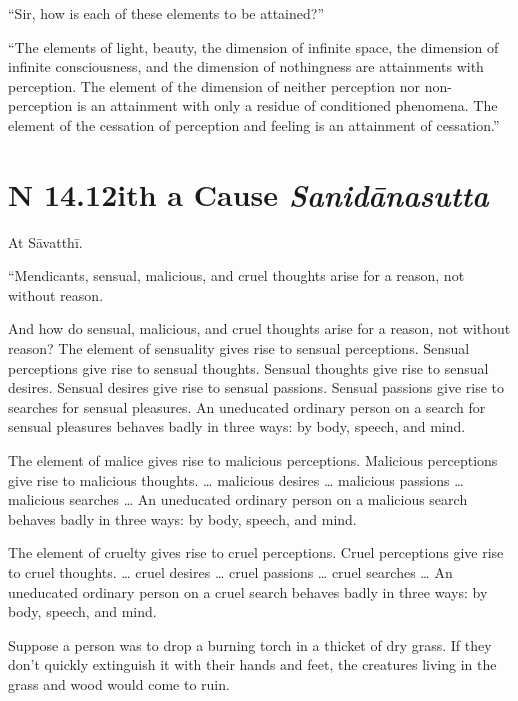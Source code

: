 \documentclass[12pt,openany]{book}%
\newcommand*{\suttatitleacronym}[1]{\smaller[2]{#1}\vspace*{.3em}}
\newcommand*{\suttatitletranslation}[1]{\linebreak{#1}}
\newcommand*{\suttatitleroot}[1]{\linebreak\smaller[2]\itshape{#1}}
\newcommand*{\tocacronym}[1]{\hspace*{-3.3em}{#1}\quad}
\newcommand*{\toctranslation}[1]{#1}
\newcommand*{\tocroot}[1]{(\textit{#1})}
\begin{document}
“Sir, how is each of these elements to be attained?” 

“The elements of light, beauty, the dimension of infinite space, the dimension of infinite consciousness, and the dimension of nothingness are attainments with perception. The element of the dimension of neither perception nor non-perception is an attainment with only a residue of conditioned phenomena. The element of the cessation of perception and feeling is an attainment of cessation.” 

%
\section*{{\suttatitleacronym SN 14.12}{\suttatitletranslation With a Cause }{\suttatitleroot Sanidānasutta}}
\addcontentsline{toc}{section}{\tocacronym{SN 14.12} \toctranslation{With a Cause } \tocroot{Sanidānasutta}}

At \textsanskrit{Sāvatthī}. 

“Mendicants, sensual, malicious, and cruel thoughts arise for a reason, not without reason. 

And how do sensual, malicious, and cruel thoughts arise for a reason, not without reason? The element of sensuality gives rise to sensual perceptions. Sensual perceptions give rise to sensual thoughts. Sensual thoughts give rise to sensual desires. Sensual desires give rise to sensual passions. Sensual passions give rise to searches for sensual pleasures. An uneducated ordinary person on a search for sensual pleasures behaves badly in three ways: by body, speech, and mind. 

The element of malice gives rise to malicious perceptions. Malicious perceptions give rise to malicious thoughts. … malicious desires … malicious passions … malicious searches … An uneducated ordinary person on a malicious search behaves badly in three ways: by body, speech, and mind. 

The element of cruelty gives rise to cruel perceptions. Cruel perceptions give rise to cruel thoughts. … cruel desires … cruel passions … cruel searches … An uneducated ordinary person on a cruel search behaves badly in three ways: by body, speech, and mind. 

Suppose a person was to drop a burning torch in a thicket of dry grass. If they don’t quickly extinguish it with their hands and feet, the creatures living in the grass and wood would come to ruin. 
\end{document}

